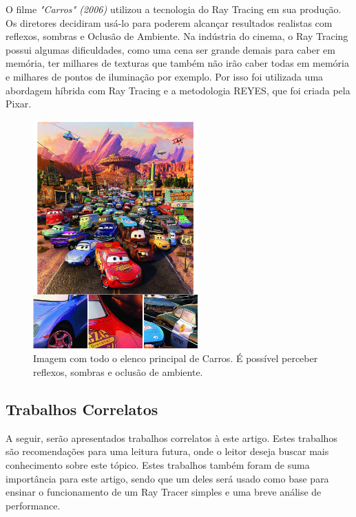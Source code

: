 \documentclass[journal]{IEEEtran}
\begin{document}
O filme \emph{"Carros" (2006)} utilizou a tecnologia do Ray Tracing em sua produção.
Os diretores decidiram usá-lo para poderem alcançar resultados realistas com reflexos,
sombras e Oclusão de Ambiente. Na indústria do cinema, o Ray Tracing possui algumas
dificuldades, como uma cena ser grande demais para caber em memória, ter milhares
de texturas que também não irão caber todas em memória e milhares de pontos de iluminação
por exemplo. Por isso foi utilizada uma abordagem híbrida com Ray Tracing e a metodologia
REYES, que foi criada pela Pixar.
\cite{c9}

\begin{figure}[ht]
  \centering
  \includegraphics[width=2.5in]{media/carros.png}
  \caption{Imagem com todo o elenco principal de Carros. É possível perceber reflexos, sombras e oclusão de ambiente. \cite{c9}}
  \label{img_carros}
\end{figure}

\subsection{Trabalhos Correlatos}
A seguir, serão apresentados trabalhos correlatos à este artigo. Estes trabalhos
são recomendações para uma leitura futura, onde o leitor deseja buscar mais
conhecimento sobre este tópico. Estes trabalhos também foram de suma importância
para este artigo, sendo que um deles será usado como base para ensinar o
funcionamento de um Ray Tracer simples e uma breve análise de performance.
\end{document}
